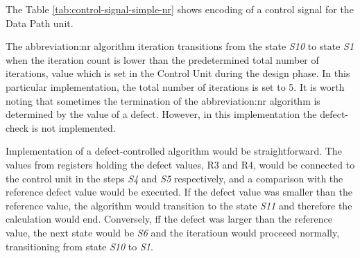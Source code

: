 \documentclass[a4paper, twoside, 11pt]{article}
\newcommand{\fbar}{\FloatBarrier}
\begin{document}
            The Table \ref{tab:control-signal-simple-nr} shows encoding of a control signal for the Data Path unit.\par
            The \gls{abbreviation:nr} algorithm iteration transitions from the state \textit{S10} to state \textit{S1} when the iteration count is lower than the predetermined total number of iterations, value which is set in the Control Unit during the design phase. In this particular implementation, the total number of iterations is set to 5. It is worth noting that sometimes the termination of the \gls{abbreviation:nr} algorithm is determined by the value of a defect. However, in this implementation the defect-check is not implemented.\par
            Implementation of a defect-controlled algorithm would be straightforward. The values from registers holding the defect values, R3 and R4, would be connected to the control unit in the steps \textit{S4} and \textit{S5} respectively, and a comparison with the reference defect value would be executed. If the defect value was smaller than the reference value, the algorithm would transition to the state \textit{S11} and therefore the calculation would end. Conversely, ff the defect was larger than the reference value, the next state would be \textit{S6} and the iteratioun would proceeed normally, transitioning from state \textit{S10} to \textit{S1}.

            

    \fbar
\end{document}

